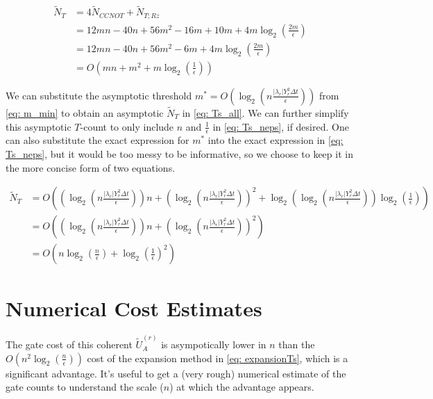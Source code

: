 \begin{equation}
    \begin{split}
        \tilde{N}_{T} &= 4\tilde{N}_{CCNOT} + \tilde{N}_{T; Rz} \\
        &= 12mn - 40n + 56m^2 - 16m + 10m + 4m\log_2(\frac{2m}{\epsilon}) \\
        &= 12mn - 40n + 56m^2 - 6m + 4m\log_2(\frac{2m}{\epsilon}) \\
        &= O(mn + m^2 + m\log_2(\frac{1}{\epsilon})) \label{eq: Ts_mneps}
    \end{split}
\end{equation}

We can substitute the asymptotic threshold $m^* = O(\log_2\left(n\frac{|\lambda_r|Y_r^2\Delta t}{\epsilon}\right))$ from \eqref{eq: m_min} to obtain an asymptotic $\tilde{N}_{T}$ in \eqref{eq: Ts_all}. We can further simplify this asymptotic $T$-count to only include $n$ and $\frac{1}{\epsilon}$ in \eqref{eq: Ts_neps}, if desired. One can also substitute the exact expression for $m^*$ into the exact expression in \eqref{eq: Ts_neps}, but it would be too messy to be informative, so we choose to keep it in the more concise form of two equations.

\begin{align}
    \tilde{N}_{T} &= O((\log_2\left(n\frac{|\lambda_r|Y_r^2\Delta t}{\epsilon}\right))n + (\log_2\left(n\frac{|\lambda_r|Y_r^2\Delta t}{\epsilon}\right))^2 + \log_2(\log_2\left(n\frac{|\lambda_r|Y_r^2\Delta t}{\epsilon}\right))\log_2(\frac{1}{\epsilon})) \nonumber \\
    &= O((\log_2\left(n\frac{|\lambda_r|Y_r^2\Delta t}{\epsilon}\right))n + (\log_2\left(n\frac{|\lambda_r|Y_r^2\Delta t}{\epsilon}\right))^2) \label{eq: Ts_all} \\
    &= O(n\log_2(\frac{n}{\epsilon}) + \log_2(\frac{1}{\epsilon})^2) \label{eq: Ts_neps}
\end{align}

\section{Numerical Cost Estimates}

The gate cost of this coherent $\tilde{U}_A^{(r)}$ is asympotically lower in $n$ than the $O(n^2\log_2(\frac{n}{\epsilon}))$ cost of the expansion method in \eqref{eq: expansionTs}, which is a significant advantage. It's useful to get a (very rough) numerical estimate of the gate counts to understand the scale ($n$) at which the advantage appears.

